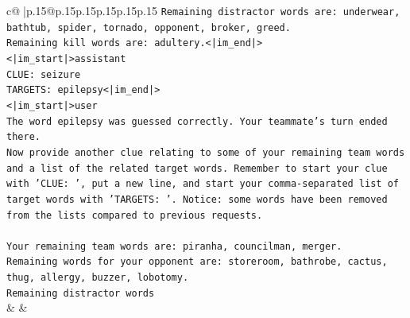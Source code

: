 \documentclass{article}
\begin{document}
{\begin{supertabular}{c@{$\;$}|p{.15\linewidth}@{}p{.15\linewidth}p{.15\linewidth}p{.15\linewidth}p{.15\linewidth}p{.15\linewidth}}
{{{\texttt{Remaining distractor words are: underwear, bathtub, spider, tornado, opponent, broker, greed.} \\
\texttt{Remaining kill words are: adultery.<|im\_end|>} \\
\texttt{<|im\_start|>assistant} \\
\texttt{CLUE: seizure} \\
\texttt{TARGETS: epilepsy<|im\_end|>} \\
\texttt{<|im\_start|>user} \\
\texttt{The word epilepsy was guessed correctly. Your teammate's turn ended there.} \\
\texttt{Now provide another clue relating to some of your remaining team words and a list of the related target words. Remember to start your clue with 'CLUE: ', put a new line, and start your comma{-}separated list of target words with 'TARGETS: '. Notice: some words have been removed from the lists compared to previous requests.} \\
\\ 
\texttt{Your remaining team words are: piranha, councilman, merger.} \\
\texttt{Remaining words for your opponent are: storeroom, bathrobe, cactus, thug, allergy, buzzer, lobotomy.} \\
\texttt{Remaining distractor words} \\
            }
        }
    }
    & & \\ \\


\end{supertabular}}
\end{document}
